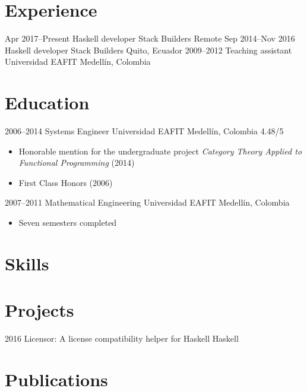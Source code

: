 \documentclass[12pt,letterpaper,sans]{moderncv}
\begin{document}
\makecvtitle

\section{Experience}

\cventry
  {Apr 2017--Present}
  {Haskell developer}
  {Stack Builders}
  {Remote}
  {}
  {}
\cventry
  {Sep 2014--Nov 2016}
  {Haskell developer}
  {Stack Builders}
  {Quito, Ecuador}
  {}
  {}
\cventry
  {2009--2012}
  {Teaching assistant}
  {Universidad EAFIT}
  {Medellín, Colombia}
  {}
  {}

\section{Education}

\cventry
  {2006--2014}
  {Systems Engineer}
  {Universidad EAFIT}
  {Medellín, Colombia}
  {4.48/5}
  {
    \begin{itemize}
    \item
      Honorable mention for the undergraduate project \emph{Category
        Theory Applied to Functional Programming} (2014)
    \item
      First Class Honors (2006)
    \end{itemize}
  }
\cventry
  {2007--2011}
  {Mathematical Engineering}
  {Universidad EAFIT}
  {Medellín, Colombia}
  {}
  {
    \begin{itemize}
    \item
      Seven semesters completed
    \end{itemize}
  }

\section{Skills}


\section{Projects}

\cventry
  {2016}
  {}
  {Licensor: A license compatibility helper for Haskell}
  {Haskell}
  {}
  {}

\section{Publications}
\end{document}
